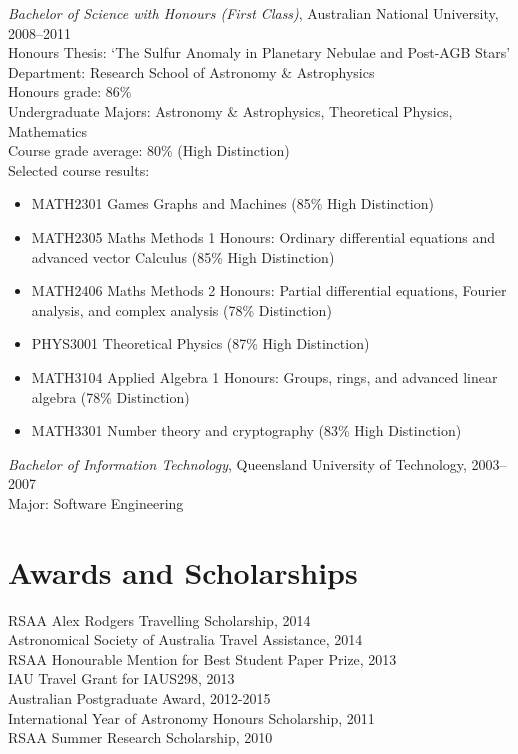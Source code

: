 \documentclass[11pt]{res} %
\begin{document}
\begin{resume}
  {\it Bachelor of Science with Honours (First Class)}, Australian National University, 2008--2011\\
  Honours Thesis: `The Sulfur Anomaly in Planetary Nebulae and Post-AGB Stars'\\
  Department: Research School of Astronomy \& Astrophysics\\
  Honours grade: 86\%\\
  Undergraduate Majors: Astronomy \& Astrophysics, Theoretical Physics, Mathematics\\
  Course grade average: 80\% (High Distinction)\\
  Selected course results:
  \begin{itemize}[leftmargin=*]
    \item MATH2301 Games Graphs and Machines (85\% High Distinction)
    \item MATH2305 Maths Methods 1 Honours: Ordinary differential equations and advanced vector Calculus (85\% High Distinction)
    \item MATH2406 Maths Methods 2 Honours: Partial differential equations, Fourier analysis, and complex analysis (78\% Distinction)
    \item PHYS3001 Theoretical Physics (87\% High Distinction)
    \item MATH3104 Applied Algebra 1 Honours: Groups, rings, and advanced linear algebra (78\% Distinction)
    \item MATH3301 Number theory and cryptography (83\% High Distinction)
  \end{itemize}

  {\it Bachelor of Information Technology}, Queensland University of Technology, 2003--2007\\
  Major: Software Engineering

\section{Awards and Scholarships}
  RSAA Alex Rodgers Travelling Scholarship, 2014\\
  Astronomical Society of Australia Travel Assistance, 2014\\
  RSAA Honourable Mention for Best Student Paper Prize, 2013\\
  IAU Travel Grant for IAUS298, 2013\\
  Australian Postgraduate Award, 2012-2015\\
  International Year of Astronomy Honours Scholarship, 2011\\
  RSAA Summer Research Scholarship, 2010


\end{resume}
\end{document}
